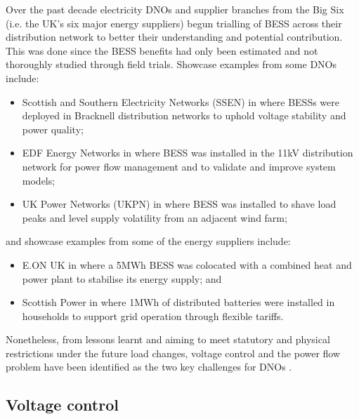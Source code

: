 Over the past decade electricity DNOs and supplier branches from the Big Six (i.e. the UK's six major energy suppliers) begun trialling of BESS across their distribution network to better their understanding and potential contribution.
This was done since the BESS benefits had only been estimated and not thoroughly studied through field trials.
Showcase examples from some DNOs include:
\begin{itemize}
	\item Scottish and Southern Electricity Networks (SSEN) in \cite{NTVV2016} where BESSs were deployed in Bracknell distribution networks to uphold voltage stability and power quality;
	\item EDF Energy Networks in \cite{Wade2010} where BESS was installed in the 11kV distribution network for power flow management and to validate and improve system models;
	\item UK Power Networks (UKPN) in \cite{Lyons2015a} where BESS was installed to shave load peaks and level supply volatility from an adjacent wind farm;
\end{itemize}
and showcase examples from some of the energy suppliers include:
\begin{itemize}
	\item E.ON UK in \cite{EON2017} where a 5MWh BESS was colocated with a combined heat and power plant to stabilise its energy supply; and
	\item Scottish Power in \cite{ScottishPower2016} where 1MWh of distributed batteries were installed in households to support grid operation through flexible tariffs.
\end{itemize}
Nonetheless, from lessons learnt and aiming to meet statutory and physical restrictions under the future load changes, voltage control and the power flow problem have been identified as the two key challenges for DNOs \cite{Ferreira2013a, Shi2015}.

\subsection{Voltage control}
\label{ch-literature:subsec:voltage-control}

